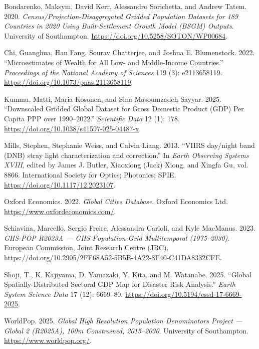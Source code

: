 \documentclass[
  letterpaper,
  DIV=11,
  numbers=noendperiod]{scrreprt}
\newlength{\cslhangindent}
\newenvironment{CSLReferences}[2] %
 {\begin{list}{}{%
  \setlength{\itemindent}{0pt}
  \setlength{\leftmargin}{0pt}
  \setlength{\parsep}{0pt}
  \ifodd #1
   \setlength{\leftmargin}{\cslhangindent}
   \setlength{\itemindent}{-1\cslhangindent}
  \fi
  \setlength{\itemsep}{#2\baselineskip}}}
 {\end{list}}
\begin{document}
\protect{}\label{refs}
\begin{CSLReferences}{1}{1}
Bondarenko, Maksym, David Kerr, Alessandro Sorichetta, and Andrew Tatem.
2020. \emph{Census/Projection-Disaggregated Gridded Population Datasets
for 189 Countries in 2020 Using Built-Settlement Growth Model ({BSGM})
Outputs}. University of Southampton.
\url{https://doi.org/10.5258/SOTON/WP00684}.

Chi, Guanghua, Han Fang, Sourav Chatterjee, and Joshua E. Blumenstock.
2022. {``Microestimates of Wealth for All Low- and Middle-Income
Countries.''} \emph{Proceedings of the National Academy of Sciences} 119
(3): e2113658119. \url{https://doi.org/10.1073/pnas.2113658119}.

Kummu, Matti, Maria Kosonen, and Sina Masoumzadeh Sayyar. 2025.
{``Downscaled Gridded Global Dataset for Gross Domestic Product ({GDP})
Per Capita {PPP} over 1990--2022.''} \emph{Scientific Data} 12 (1): 178.
\url{https://doi.org/10.1038/s41597-025-04487-x}.

Mills, Stephen, Stephanie Weiss, and Calvin Liang. 2013. {``{VIIRS
day/night band (DNB) stray light characterization and correction}.''} In
\emph{Earth Observing Systems XVIII}, edited by James J. Butler,
Xiaoxiong (Jack) Xiong, and Xingfa Gu, vol. 8866. International Society
for Optics; Photonics; SPIE. \url{https://doi.org/10.1117/12.2023107}.

Oxford Economics. 2022. \emph{Global Cities Database}. Oxford Economics
Ltd. \url{https://www.oxfordeconomics.com/}.

Schiavina, Marcello, Sergio Freire, Alessandra Carioli, and Kyle
MacManus. 2023. \emph{{GHS-POP R2023A} --- {GHS} Population Grid
Multitemporal (1975--2030)}. European Commission, Joint Research Centre
({JRC}).
\url{https://doi.org/10.2905/2FF68A52-5B5B-4A22-8F40-C41DA8332CFE}.

Shoji, T., K. Kajiyama, D. Yamazaki, Y. Kita, and M. Watanabe. 2025.
{``Global Spatially-Distributed Sectoral {GDP} Map for Disaster Risk
Analysis.''} \emph{Earth System Science Data} 17 (12): 6669--80.
\url{https://doi.org/10.5194/essd-17-6669-2025}.

WorldPop. 2025. \emph{Global High Resolution Population Denominators
Project --- {Global 2 (R2025A)}, 100m Constrained, 2015--2030}.
University of Southampton. \url{https://www.worldpop.org/}.

\end{CSLReferences}
\end{document}
